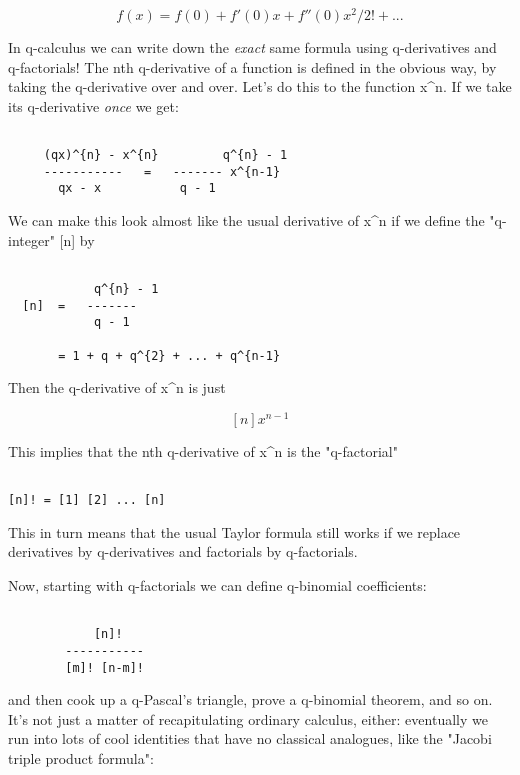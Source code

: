 $$

f(x) = f(0) + f'(0) x + f''(0) x^{2}/2! + ... 
$$
    
In q-calculus we can write down the \emph{exact} same formula using
q-derivatives and q-factorials!  The nth q-derivative of a function is
defined in the obvious way, by taking the q-derivative over and over.  
Let's do this to the function x^{n}.  
If we take its q-derivative \emph{once} we get:


\begin{verbatim}

     (qx)^{n} - x^{n}         q^{n} - 1
     -----------   =   ------- x^{n-1} 
       qx - x           q - 1
\end{verbatim}
    
We can make this look almost like the usual derivative of x^{n} if
we define the "q-integer" [n] by


\begin{verbatim}

            q^{n} - 1
  [n]  =   -------   
            q - 1

       = 1 + q + q^{2} + ... + q^{n-1}
\end{verbatim}
    
Then the q-derivative of x^{n} is just 


$$

[n] x^{n-1}
$$
    
This implies that the nth q-derivative of x^{n} is the "q-factorial"
 

\begin{verbatim}

[n]! = [1] [2] ... [n] 
\end{verbatim}
    
This in turn means that the usual Taylor formula still works if we
replace derivatives by q-derivatives and factorials by q-factorials.

Now, starting with q-factorials we can define q-binomial coefficients:


\begin{verbatim}

            [n]! 
        -----------
        [m]! [n-m]!
\end{verbatim}
    
and then cook up a q-Pascal's triangle, prove a q-binomial theorem, and 
so on.  It's not just a matter of recapitulating ordinary calculus, 
either: eventually we run into lots of cool identities that have no 
classical analogues, like the "Jacobi triple product formula":


